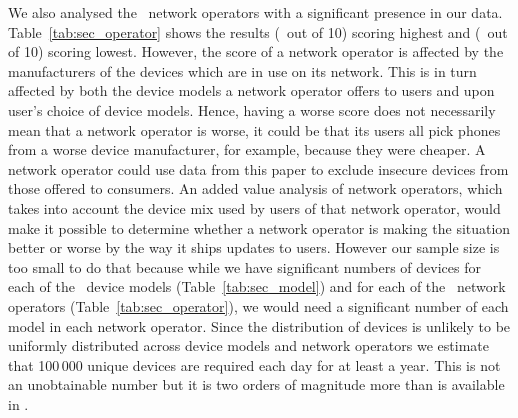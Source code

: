 We also analysed the \daNumSigOperators\ network operators with a significant presence in our data.
Table~\ref{tab:sec_operator} shows the results \emph{\daSecScoreBestoperator} (\daSecScoreBestoperatorScore\ out of 10) scoring highest and \emph{\daSecScoreWorstoperator} (\daSecScoreWorstoperatorScore\ out of 10) scoring lowest.
However, the score of a network operator is affected by the manufacturers of the devices which are in use on its network.
This is in turn affected by both the device models a network operator offers to users and upon user's choice of device models.
Hence, having a worse score does not necessarily mean that a network operator is worse, it could be that its users all pick phones from a worse device manufacturer, for example, because they were cheaper.
A network operator could use data from this paper to exclude insecure devices from those offered to consumers.
An added value analysis of network operators, which takes into account the device mix used by users of that network operator, would make it possible to determine whether a network operator is making the situation better or worse by the way it ships updates to users.
However our sample size is too small to do that because while we have significant numbers of devices for each of the \daNumSigModels\ device models (Table~\ref{tab:sec_model}) and for each of the \daNumSigOperators\ network operators (Table~\ref{tab:sec_operator}), we would need a significant number of each model in each network operator.
Since the distribution of devices is unlikely to be uniformly distributed across device models and network operators we estimate that 100\,000 unique devices are required each day for at least a year.
This is not an unobtainable number but it is two orders of magnitude more than is available in \da.

